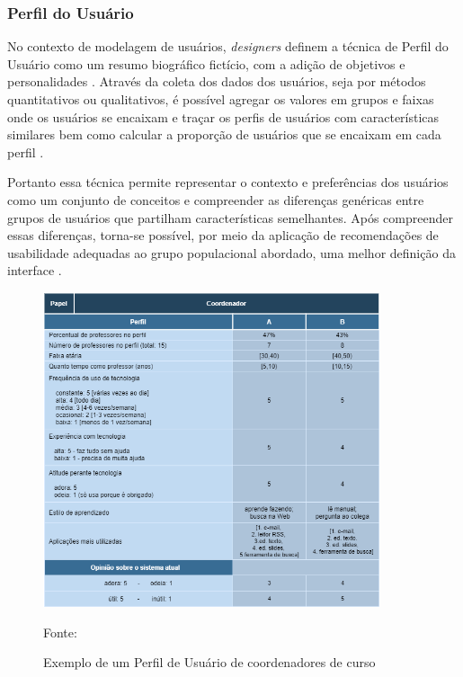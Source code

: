 \documentclass[12pt]{article}
\begin{document}
\subsubsection{Perfil do Usuário}
\par No contexto de modelagem de usuários, \emph{designers} definem a técnica de Perfil do Usuário como um resumo biográfico fictício, com a adição de objetivos e personalidades \cite{10.1007/BF00143964}. Através da coleta dos dados dos usuários, seja por métodos quantitativos ou qualitativos, é possível agregar os valores em grupos e faixas onde os usuários se encaixam e traçar os perfis de usuários com características similares bem como calcular a proporção de usuários que se encaixam em cada perfil \cite{barbosa2010interacao}.

Portanto essa técnica permite representar o contexto e preferências dos usuários como um conjunto de conceitos e compreender as diferenças genéricas entre grupos de usuários que partilham características semelhantes. Após compreender essas diferenças, torna-se possível, por meio da aplicação de recomendações de usabilidade adequadas ao grupo populacional abordado, uma melhor definição da interface \cite{10.1145/1111360.1111388} \cite{7358378}.

\begin{figure}[H]
    \centering
    \includegraphics[width=0.882\textwidth]{images/PerfilDoUsuario.png}
    \caption{Exemplo de um Perfil de Usuário de coordenadores de curso}
    \label{fig:PerfilDoUsuario}
    {Fonte: \cite{barbosa2010interacao}}
\end{figure}
\end{document}
